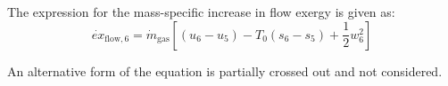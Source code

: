 The expression for the mass-specific increase in flow exergy is given as:  
\[
\dot{ex}_{\text{flow},6} = \dot{m}_{\text{gas}} \left[ (u_6 - u_5) - T_0 (s_6 - s_5) + \frac{1}{2} w_6^2 \right]
\]  

An alternative form of the equation is partially crossed out and not considered.